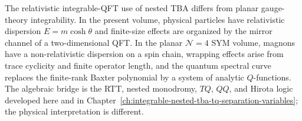 The relativistic integrable-QFT use of nested TBA differs from planar
gauge-theory integrability.  In the present volume, physical particles have
relativistic dispersion \(E=m\cosh\theta\) and finite-size effects are
organized by the mirror channel of a two-dimensional QFT.  In the planar
\(\mathcal N=4\) SYM volume, magnons have a non-relativistic dispersion on a
spin chain, wrapping effects arise from trace cyclicity and finite operator
length, and the quantum spectral curve replaces the finite-rank Baxter
polynomial by a system of analytic \(Q\)-functions.  The algebraic bridge is
the RTT, nested monodromy, \(TQ\), \(QQ\), and Hirota logic developed here
and in Chapter~\ref{ch:integrable-nested-tba-tq-separation-variables}; the
physical interpretation is different.
